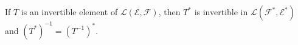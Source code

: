 If $T$ is an invertible element of $\mathcal{L}(\mathcal{E}, \mathcal{F})$, then $T^*$ is invertible in $\mathcal{L}(\mathcal{F}^*, \mathcal{E}^*)$ and $(T^*)^{-1} = (T^{-1})^*$.
